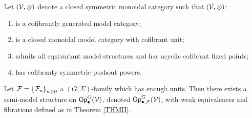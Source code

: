 \documentclass[a4paper,10pt
]{article}%
\renewcommand{\F}{\mathcal F}
\renewcommand{\1}{\eta}%
\begin{document}
\begin{theorem}
	\label{THMII_S}
	Let $(\mathcal V,\otimes)$ denote a closed symmetric monoidal category such that
	$(\mathcal V, \otimes)$:
	\begin{enumerate}[label = (\roman*)]
		\item is a cofibrantly generated model category;
		\item is a closed monoidal model category with cofibrant unit;
		\item admits all equivariant model structures and has acyclic cofibrant fixed points;
		\item has cofibranty symmetric pushout powers.
	\end{enumerate}
	
	Let $\F = \set{\F_n}_{n \geq 0}$ a $(G, \Sigma)$-family which has enough units.
	Then there exists a semi-model structure on $\mathsf{Op}^G_\bullet(\mathcal V)$, denoted $\Op^G_{\bullet,\F}(\V)$,
	with weak equivalences and fibrations defined as in Theorem \ref{THMII}.
\end{theorem}










{}

\end{document}

